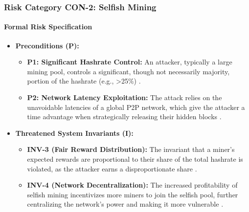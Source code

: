 \subsubsection{Risk Category CON-2: Selfish Mining}

\paragraph{Formal Risk Specification}

\begin{itemize}
    \item \textbf{Preconditions (P):}
    \begin{itemize}
        \item \textbf{P1: Significant Hashrate Control:} An attacker, typically a large mining pool, controls a significant, though not necessarily majority, portion of the hashrate (e.g., >25\%) \cite{eyal2014}.
        \item \textbf{P2: Network Latency Exploitation:} The attack relies on the unavoidable latencies of a global P2P network, which give the attacker a time advantage when strategically releasing their hidden blocks \cite{eyal2014, wang2019}.
    \end{itemize}

    \item \textbf{Threatened System Invariants (I):}
    \begin{itemize}
        \item \textbf{INV-3 (Fair Reward Distribution):} The invariant that a miner's expected rewards are proportional to their share of the total hashrate is violated, as the attacker earns a disproportionate share \cite{eyal2014}.
        \item \textbf{INV-4 (Network Decentralization):} The increased profitability of selfish mining incentivizes more miners to join the selfish pool, further centralizing the network's power and making it more vulnerable \cite{eyal2014}.
    \end{itemize}


\end{itemize}
